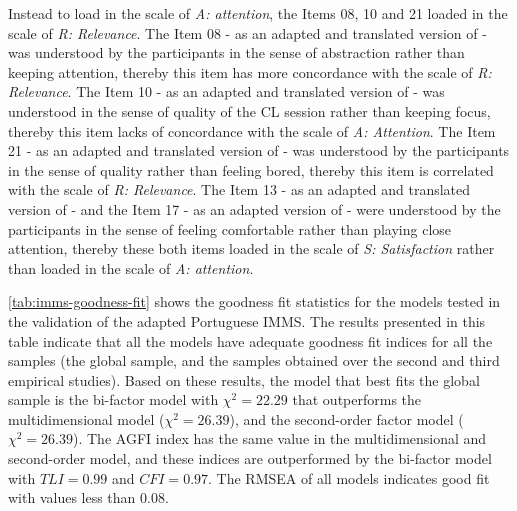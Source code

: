 Instead to load in the scale of \emph{A: attention}, the Items 08, 10 and 21 loaded in the scale of \emph{R: Relevance}. The Item 08 -  as an adapted and translated version of  - was understood by the participants in the sense of abstraction rather than keeping attention, thereby this item has more concordance with the scale of \emph{R: Relevance}. The Item 10 -  as an adapted and translated version of  - was understood in the sense of quality of the CL session rather than keeping focus, thereby this item lacks of concordance with the scale of \emph{A: Attention}. The Item 21 -  as an adapted and translated version of  - was understood by the participants in the sense of quality rather than feeling bored, thereby this item is correlated with the scale of \emph{R: Relevance}. The Item 13 -  as an adapted and translated version of  - and the Item 17 -  as an adapted version of  - were understood by the participants in the sense of feeling comfortable rather than playing close attention, thereby these both items loaded in the scale of \emph{S: Satisfaction} rather than loaded in the scale of \emph{A: attention}.

\autoref{tab:imms-goodness-fit} shows the goodness fit statistics for the models tested in the validation of the adapted Portuguese IMMS. The results presented in this table indicate that all the models have adequate goodness fit indices for all the samples (the global sample, and the samples obtained over the second and third empirical studies). Based on these results, the model that best fits the global sample is the bi-factor model with ${\chi}^2 = 22.29$ that outperforms the multidimensional model (${\chi}^2 = 26.39$), and the second-order factor model (${\chi}^2 = 26.39$). The AGFI index has the same value in the multidimensional and second-order model, and these indices are outperformed by the bi-factor model with $TLI = 0.99$ and $CFI = 0.97$. The RMSEA of all models indicates good fit with values less than 0.08.

